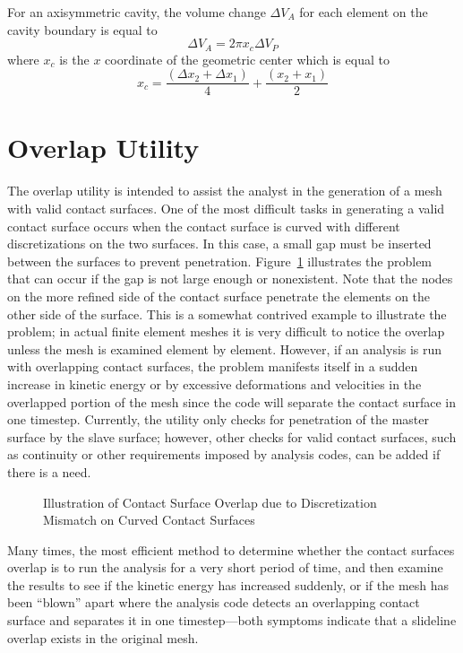 For an axisymmetric cavity, the volume change $\Delta V_A$ for each
element on the cavity boundary is equal to 
\begin{equation}
\Delta V_A = 2\pi x_c \Delta V_P
\end{equation}
where $x_c$ is the $x$ coordinate of the geometric center which is equal
to 
\begin{equation}
x_c = \frac{(\Delta x_2 + \Delta x_1)}{4} + 
      \frac{(x_2 + x_1)}{2}
\end{equation}

\section{Overlap Utility}\label{sec:overlap}

The overlap utility is intended to assist the analyst in the generation
of a mesh with valid contact surfaces.  One of the most difficult tasks
in generating a valid contact surface occurs when the contact surface is
curved with different discretizations on the two surfaces.  In this
case, a small gap must be inserted between the surfaces to prevent
penetration. Figure~\ref{f:overlap} illustrates the problem that can
occur if the gap is not large enough or nonexistent. Note that the nodes
on the more refined side of the contact surface penetrate the elements
on the other side of the surface.  This is a somewhat contrived example
to illustrate the problem; in actual finite element meshes it is very
difficult to notice the overlap unless the mesh is examined element by
element. However, if an analysis is run with overlapping contact
surfaces, the problem manifests itself in a sudden increase in kinetic
energy or by excessive deformations and velocities in the overlapped
portion of the mesh since the code will separate the contact surface in
one timestep.  Currently, the utility only checks for penetration of the
master surface by the slave surface; however, other checks for valid
contact surfaces, such as continuity or other requirements imposed by
analysis codes, can be added if there is a need. 

\begin{figure}
\vspace{3.1in}
\caption{Illustration of Contact Surface Overlap due to
Discretization Mismatch on Curved Contact Surfaces}
\label{f:overlap}
\end{figure}

Many times, the most efficient method to determine whether the contact
surfaces overlap is to run the analysis for a very short period of time,
and then examine the results to see if the kinetic energy has increased
suddenly, or if the mesh has been ``blown'' apart where the analysis
code detects an overlapping contact surface and separates it in one
timestep---both symptoms indicate that a slideline overlap exists in the
original mesh. 

